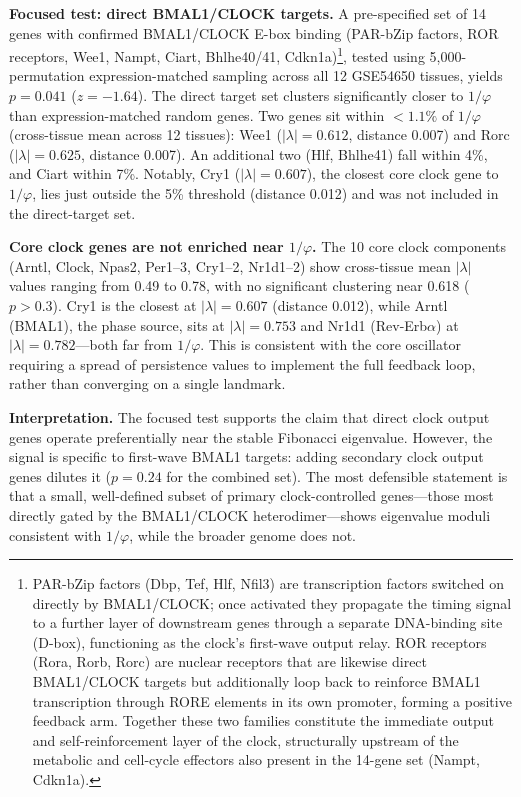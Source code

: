\documentclass[11pt,letterpaper]{article}
\theoremstyle{definition}
\theoremstyle{remark}
\begin{document}
\textbf{Focused test: direct BMAL1/CLOCK targets.} A pre-specified set of 14 genes with confirmed BMAL1/CLOCK E-box binding (PAR-bZip factors, ROR receptors, Wee1, Nampt, Ciart, Bhlhe40/41, Cdkn1a)\footnote{PAR-bZip factors (Dbp, Tef, Hlf, Nfil3) are transcription factors switched on directly by BMAL1/CLOCK; once activated they propagate the timing signal to a further layer of downstream genes through a separate DNA-binding site (D-box), functioning as the clock's first-wave output relay. ROR receptors (Rora, Rorb, Rorc) are nuclear receptors that are likewise direct BMAL1/CLOCK targets but additionally loop back to reinforce BMAL1 transcription through RORE elements in its own promoter, forming a positive feedback arm. Together these two families constitute the immediate output and self-reinforcement layer of the clock, structurally upstream of the metabolic and cell-cycle effectors also present in the 14-gene set (Nampt, Cdkn1a).}, tested using 5{,}000-permutation expression-matched sampling across all 12 GSE54650 tissues, yields $p = 0.041$ ($z = -1.64$). The direct target set clusters significantly closer to $1/\varphi$ than expression-matched random genes. Two genes sit within $<1.1\%$ of $1/\varphi$ (cross-tissue mean across 12 tissues): Wee1 ($|\lambda| = 0.612$, distance 0.007) and Rorc ($|\lambda| = 0.625$, distance 0.007). An additional two (Hlf, Bhlhe41) fall within 4\%, and Ciart within 7\%. Notably, Cry1 ($|\lambda| = 0.607$), the closest core clock gene to $1/\varphi$, lies just outside the 5\% threshold (distance 0.012) and was not included in the direct-target set.

\textbf{Core clock genes are not enriched near $1/\varphi$.} The 10 core clock components (Arntl, Clock, Npas2, Per1--3, Cry1--2, Nr1d1--2) show cross-tissue mean $|\lambda|$ values ranging from 0.49 to 0.78, with no significant clustering near 0.618 ($p > 0.3$). Cry1 is the closest at $|\lambda| = 0.607$ (distance 0.012), while Arntl (BMAL1), the phase source, sits at $|\lambda| = 0.753$ and Nr1d1 (Rev-Erb$\alpha$) at $|\lambda| = 0.782$---both far from $1/\varphi$. This is consistent with the core oscillator requiring a spread of persistence values to implement the full feedback loop, rather than converging on a single landmark.

\textbf{Interpretation.} The focused test supports the claim that direct clock output genes operate preferentially near the stable Fibonacci eigenvalue. However, the signal is specific to first-wave BMAL1 targets: adding secondary clock output genes dilutes it ($p = 0.24$ for the combined set). The most defensible statement is that a small, well-defined subset of primary clock-controlled genes---those most directly gated by the BMAL1/CLOCK heterodimer---shows eigenvalue moduli consistent with $1/\varphi$, while the broader genome does not.
\end{document}
